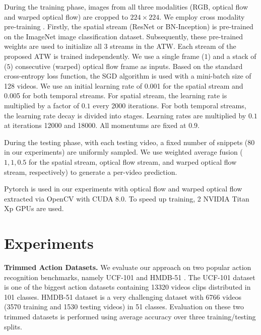 \documentclass[runningheads,a4paper]{llncs}
\begin{document}
During the training phase, images from all three modalities (RGB, optical flow and warped optical flow) are cropped to $224\times224$. We employ cross modality pre-training \cite{wang2016temporal}. Firstly, the spatial stream (ResNet or BN-Inception) is pre-trained on the ImageNet image classification dataset. Subsequently, these pre-trained weights are used to initialize all $3$ streams in the ATW. Each stream of the proposed ATW is trained independently. We use a single frame ($1$) and a stack of ($5$) consecutive (warped) optical flow frame as inputs. Based on the standard cross-entropy loss function, the SGD algorithm is used with a mini-batch size of 128 videos. We use an initial learning rate of 0.001 for the spatial stream and 0.005 for both temporal streams. For spatial stream, the learning rate is multiplied by a factor of $0.1$ every 2000 iterations. For both temporal streams, the learning rate decay is divided into stages. Learning rates are multiplied by $0.1$ at iterations 12000 and 18000. All momentums are fixed at $0.9$.

During the testing phase, with each testing video, a fixed number of snippets (80 in our experiments) are uniformly sampled. We use weighted average fusion ($1, 1, 0.5$ for the spatial stream, optical flow stream, and warped optical flow stream, respectively) to generate a per-video prediction.

Pytorch \cite{paszke2017pytorch} is used in our experiments with optical flow and warped optical flow extracted via OpenCV with CUDA 8.0. To speed up training, 2 NVIDIA Titan Xp GPUs are used.

%
\section{Experiments}
%
%
%
\noindent \textbf{Trimmed Action Datasets.} We evaluate our approach on two popular action recognition benchmarks, namely UCF-101
\cite{soomro2012ucf101} and HMDB-51 \cite{kuehne2013hmdb51}.
The UCF-101 dataset is one of the biggest action datasets containing 13320 videos
clips distributed in 101 classes. HMDB-51 dataset is a very challenging dataset with 6766 videos (3570 training and 1530 testing videos)
in 51 classes. Evaluation on these two trimmed datasets is performed using average accuracy over three training/testing splits.
%
\end{document}
